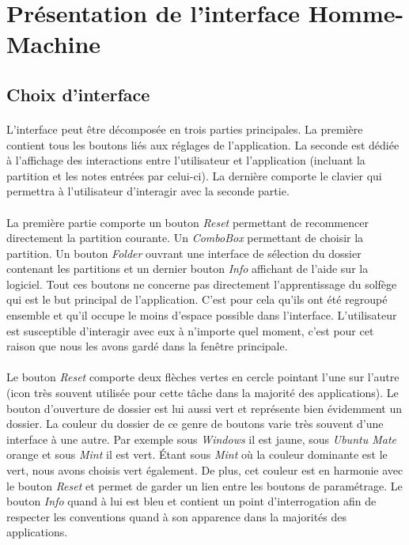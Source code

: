 \documentclass[a4paper, 12pt]{article}
\begin{document}
\section{Présentation de l'interface Homme-Machine}
    \subsection{Choix d'interface}
    \paragraph{}
    L'interface peut être décomposée en trois parties principales. La première contient tous les boutons liés aux réglages de l'application. La seconde est dédiée à l'affichage des interactions entre l'utilisateur et l'application (incluant la partition et les notes entrées par celui-ci). La dernière comporte le clavier qui permettra à l'utilisateur d'interagir avec la seconde partie.
    
    \paragraph{}
    La première partie comporte un bouton \emph{Reset} permettant de recommencer directement la partition courante. Un \emph{ComboBox} permettant de choisir la partition. Un bouton \emph{Folder} ouvrant une interface de sélection du dossier contenant les partitions et un dernier bouton \emph{Info} affichant de l'aide sur la logiciel. Tout ces boutons ne concerne pas directement l'apprentissage du solfège qui est le but principal de l'application. C'est pour cela qu'ils ont été regroupé ensemble et qu'il occupe le moins d'espace possible dans l'interface. L'utilisateur est susceptible d'interagir avec eux à n'importe quel moment, c'est pour cet raison que nous les avons gardé dans la fenêtre principale.
    
    \paragraph{}
    Le bouton \emph{Reset} comporte deux flèches vertes en cercle pointant l'une sur l'autre (icon très souvent utilisée pour cette tâche dans la majorité des applications). Le bouton d'ouverture de dossier est lui aussi vert et représente bien évidemment un dossier. La couleur du dossier de ce genre de boutons varie très souvent d'une interface à une autre. Par exemple sous \emph{Windows} il est jaune, sous \emph{Ubuntu Mate} orange et sous \emph{Mint} il est vert. Étant sous \emph{Mint} où la couleur dominante est le vert, nous avons choisis vert également. De plus, cet couleur est en harmonie avec le bouton \emph{Reset} et permet de garder un lien entre les boutons de paramétrage. Le bouton \emph{Info} quand à lui est bleu et contient un point d'interrogation afin de respecter les conventions quand à son apparence dans la majorités des applications.
    
\end{document}
